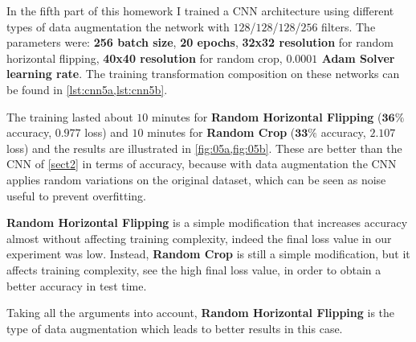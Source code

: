 \documentclass[a4paper, 11pt]{article}
\begin{document}
	In the fifth part of this homework I trained a CNN architecture using different types of data augmentation the network with $128$/$128$/$128$/$256$ filters. The parameters were: \textbf{256 batch size}, \textbf{20 epochs}, \textbf{32x32 resolution} for random horizontal flipping, \textbf{40x40 resolution} for random crop, \textbf{$\boldsymbol{0.0001}$ Adam Solver learning rate}. The training transformation composition on these networks can be found in \vref{lst:cnn5a,lst:cnn5b}.
	
	
	
	
	The training lasted about $10$ minutes for \textbf{Random Horizontal Flipping} ($\boldsymbol{36\%}$ accuracy, $\boldsymbol{0.977}$ loss)  and $10$ minutes for \textbf{Random Crop} ($\boldsymbol{33\%}$ accuracy, $\boldsymbol{2.107}$ loss) and the results are illustrated in \vref{fig:05a,fig:05b}.
	These are better than the CNN of \cref{sect2} in terms of accuracy, because with data augmentation the CNN applies random variations on the original dataset, which can be seen as noise useful to prevent overfitting.
	
	\textbf{Random Horizontal Flipping} is a simple modification that increases accuracy almost without affecting training complexity, indeed the final loss value in our experiment was low. 
	Instead, \textbf{Random Crop} is still a simple modification, but it affects training complexity, see the high final loss value, in order to obtain a better accuracy in test time.  
	
	Taking all the arguments into account, \textbf{Random Horizontal Flipping} is the type of data augmentation which leads to better results in this case.
	
\end{document}
